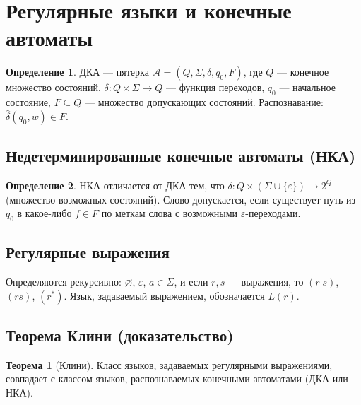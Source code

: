 \documentclass[12pt,a4paper]{article}
\theoremstyle{definition}
\newtheorem{definition}{Определение}[section]
\newtheorem{theorem}{Теорема}[section]
\newcommand{\emptystring}{\varepsilon}
\newcommand{\A}{\mathcal{A}}
\begin{document}
\section{Регулярные языки и конечные автоматы}

\begin{definition}
ДКА --- пятерка $\A = (Q, \Sigma, \delta, q_0, F)$, где $Q$ --- конечное множество состояний, $\delta: Q\times\Sigma\to Q$ --- функция переходов, $q_0$ --- начальное состояние, $F\subseteq Q$ --- множество допускающих состояний. Распознавание: $\hat\delta(q_0,w)\in F$.
\end{definition}

\subsection{Недетерминированные конечные автоматы (НКА)}

\begin{definition}
НКА отличается от ДКА тем, что $\delta: Q\times(\Sigma\cup\{\emptystring\})\to 2^Q$ (множество возможных состояний). Слово допускается, если существует путь из $q_0$ в какое-либо $f\in F$ по меткам слова с возможными $\emptystring$-переходами.
\end{definition}

\subsection{Регулярные выражения}
Определяются рекурсивно: $\varnothing$, $\emptystring$, $a\in\Sigma$, и если $r,s$ --- выражения, то $(r|s)$, $(rs)$, $(r^*)$. Язык, задаваемый выражением, обозначается $L(r)$.

\subsection{Теорема Клини (доказательство)}
\begin{theorem}[Клини]
Класс языков, задаваемых регулярными выражениями, совпадает с классом языков, распознаваемых конечными автоматами (ДКА или НКА).
\end{theorem}
\end{document}
